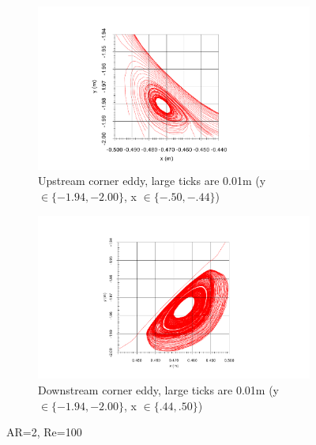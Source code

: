 \documentclass[twocolumn,10pt]{asme2ej}
\begin{document}
\begin{figure}[tbh]
        \begin{subfigure}[b]{0.22\textwidth}
                \includegraphics[width=\textwidth]{figure/leftVortex.pdf}
                \caption{Upstream corner eddy, large ticks are 0.01m (y $\in \{-1.94, -2.00\}$, x $\in \{-.50, -.44\}$)}
                \label{AR2RE100_upstream}
        \end{subfigure}%
        \qquad
        \begin{subfigure}[b]{0.22\textwidth}
                \includegraphics[width=\textwidth]{figure/rightVortex.pdf}
                \caption{Downstream corner eddy, large ticks are 0.01m (y $\in \{-1.94, -2.00\}$, x $\in \{.44, .50\}$)}
                \label{AR2RE100_downstream}
        \end{subfigure}
        \caption{AR=2, Re=100}\label{AR2RE100}

\end{figure}
\end{document}

